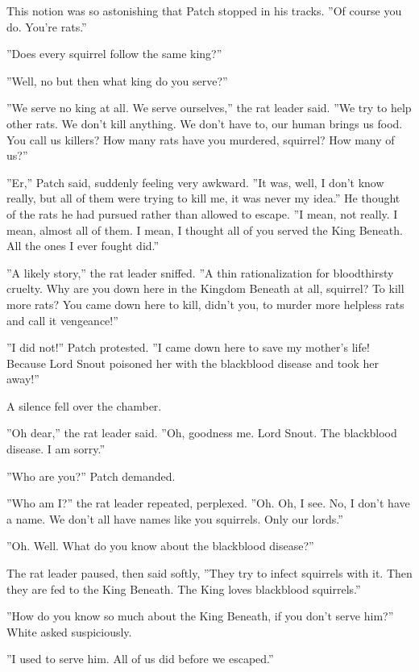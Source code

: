 \documentclass[12pt]{book}
\begin{document}
 This notion was so astonishing that Patch stopped in his tracks. ''Of course you do. You're rats.''\par
 ''Does every squirrel follow the same king?''\par
 ''Well, no %
 but %
 then what king do you serve?''\par
 ''We serve no king at all. We serve ourselves,'' the rat leader said. ''We try to help other rats. We don't kill anything. We don't have to, our human brings us food. You call us killers? How many rats have you murdered, squirrel? How many of us?''\par
 ''Er,'' Patch said, suddenly feeling very awkward. ''It was, well, I don't know really, but all of them were trying to kill me, it was never my idea.'' He thought of the rats he had pursued rather than allowed to escape. ''I mean, not really. I mean, almost all of them. I mean, I thought all of you served the King Beneath. All the ones I ever fought did.''\par
 ''A likely story,'' the rat leader sniffed. ''A thin rationalization for bloodthirsty cruelty. Why are you down here in the Kingdom Beneath at all, squirrel? To kill more rats? You came down here to kill, didn't you, to murder more helpless rats and call it vengeance!''\par
 ''I did not!'' Patch protested. ''I came down here to save my mother's life! Because Lord Snout poisoned her with the blackblood disease and took her away!''\par
 A silence fell over the chamber.\par
 ''Oh dear,'' the rat leader said. ''Oh, goodness me. Lord Snout. The blackblood disease. I am sorry.''\par
 ''Who are you?'' Patch demanded.\par
 ''Who am I?'' the rat leader repeated, perplexed. ''Oh. Oh, I see. No, I don't have a name. We don't all have names like you squirrels. Only our lords.''\par
 ''Oh. Well. What do you know about the blackblood disease?''\par
 The rat leader paused, then said softly, ''They try to infect squirrels with it. Then they are fed to the King Beneath. The King loves blackblood squirrels.''\par
 ''How do you know so much about the King Beneath, if you don't serve him?'' White asked suspiciously.\par
 ''I used to serve him. All of us did before we escaped.''\par
\end{document}
